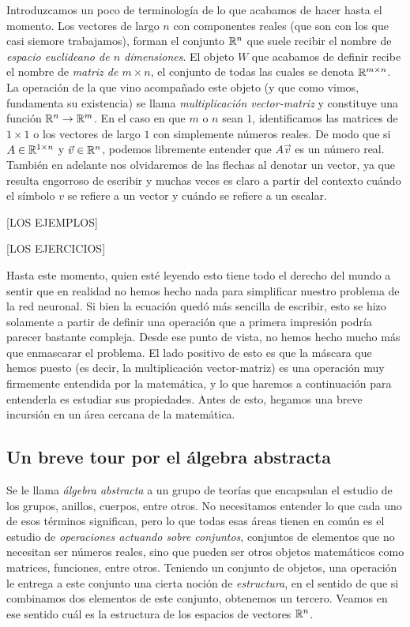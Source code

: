 Introduzcamos un poco de terminología de lo que acabamos de hacer hasta el momento. Los vectores de largo $n$ con componentes reales (que son con los que casi siemore trabajamos), forman el conjunto $\mathbb{R}^n$ que suele recibir el nombre de \textit{espacio euclideano de $n$ dimensiones}. El objeto $W$ que acabamos de definir recibe el nombre de \textit{matriz de $m \times n$}, el conjunto de todas las cuales se denota $\mathbb{R}^{m \times n}$. La operación de la que vino acompañado este objeto (y que como vimos, fundamenta su existencia) se llama \textit{multiplicación vector-matriz} y constituye una función $\mathbb{R}^n \to \mathbb{R}^m$. En el caso en que $m$ o $n$ sean $1$, identificamos las matrices de $1 \times 1$ o los vectores de largo $1$ con simplemente números reales. De modo que si $A \in \mathbb{R}^{1 \times n}$ y $\vec{v} \in \mathbb{R}^n$, podemos libremente entender que $A\vec{v}$ es un número real. También en adelante nos olvidaremos de las flechas al denotar un vector, ya que resulta engorroso de escribir y muchas veces es claro a partir del contexto cuándo el símbolo $v$ se refiere a un vector y cuándo se refiere a un escalar.

[LOS EJEMPLOS]

[LOS EJERCICIOS]

Hasta este momento, quien esté leyendo esto tiene todo el derecho del mundo a sentir que en realidad no hemos hecho nada para simplificar nuestro problema de la red neuronal. Si bien la ecuación quedó más sencilla de escribir, esto se hizo solamente a partir de definir una operación que a primera impresión podría parecer bastante compleja. Desde ese punto de vista, no hemos hecho mucho más que enmascarar el problema. El lado positivo de esto es que la máscara que hemos puesto (es decir, la multiplicación vector-matriz) es una operación muy firmemente entendida por la matemática, y lo que haremos a continuación para entenderla es estudiar sus propiedades. Antes de esto, hegamos una breve incursión en un área cercana de la matemática.

\subsection{Un breve tour por el álgebra abstracta}

Se le llama \textit{álgebra abstracta} a un grupo de teorías que encapsulan el estudio de los grupos, anillos, cuerpos, entre otros. No necesitamos entender lo que cada uno de esos términos significan, pero lo que todas esas áreas tienen en común es el estudio de \textit{operaciones actuando sobre conjuntos}, conjuntos de elementos que no necesitan ser números reales, sino que pueden ser otros objetos matemáticos como matrices, funciones, entre otros. Teniendo un conjunto de objetos, una operación le entrega a este conjunto una cierta noción de \textit{estructura}, en el sentido de que si combinamos dos elementos de este conjunto, obtenemos un tercero. Veamos en ese sentido cuál es la estructura de los espacios de vectores $\mathbb{R}^n$.

